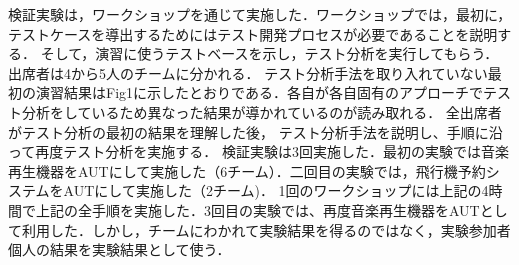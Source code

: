 \documentclass[a4paper,12pt]{jreport}
\begin{document}
検証実験は，ワークショップを通じて実施した．ワークショップでは，最初に，テストケースを導出するためにはテスト開発プロセスが必要であることを説明する．
そして，演習に使うテストベースを示し，テスト分析を実行してもらう．出席者は4から5人のチームに分かれる．
テスト分析手法を取り入れていない最初の演習結果はFig1に示したとおりである．各自が各自固有のアプローチでテスト分析をしているため異なった結果が導かれているのが読み取れる．
全出席者がテスト分析の最初の結果を理解した後， テスト分析手法を説明し、手順に沿って再度テスト分析を実施する．
検証実験は3回実施した．最初の実験では音楽再生機器をAUTにして実施した（6チーム）．二回目の実験では，飛行機予約システムをAUTにして実施した（2チーム)．
1回のワークショップには上記の4時間で上記の全手順を実施した．3回目の実験では、再度音楽再生機器をAUTとして利用した．しかし，チームにわかれて実験結果を得るのではなく，実験参加者個人の結果を実験結果として使う．
\end{document}

